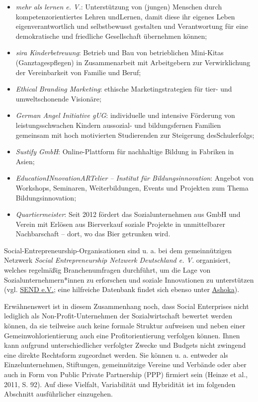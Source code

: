 \documentclass[
  letterpaper,
]{book}
\begin{document}
\begin{itemize}
\item
  \emph{mehr als lernen e. V.}: Unterstützung von (jungen) Menschen
  durch kompetenzorientiertes Lehren undLernen, damit diese ihr eigenes
  Leben eigenverantwortlich und selbstbewusst gestalten und
  Verantwortung für eine demokratische und friedliche Gesellschaft
  übernehmen können;
\item
  \emph{sira Kinderbetreuung}: Betrieb und Bau von betrieblichen
  Mini-Kitas (Ganztagespflegen) in Zusammenarbeit mit Arbeitgebern zur
  Verwirklichung der Vereinbarkeit von Familie und Beruf;
\item
  \emph{Ethical Branding Marketing}: ethische Marketingstrategien für
  tier- und umweltschonende Visionäre;
\item
  \emph{German Angel Initiative gUG}: individuelle und intensive
  Förderung von leistungsschwachen Kindern aussozial- und bildungsfernen
  Familien gemeinsam mit hoch motivierten Studierenden zur Steigerung
  desSchulerfolgs;
\item
  \emph{Sustify GmbH}: Online-Plattform für nachhaltige Bildung in
  Fabriken in Asien;
\item
  \emph{EducationINnovationARTelier -- Institut für Bildungsinnovation}:
  Angebot von Workshops, Seminaren, Weiterbildungen, Events und
  Projekten zum Thema Bildungsinnovation;
\item
  \emph{Quartiermeister}: Seit 2012 fördert das Sozialunternehmen aus
  GmbH und Verein mit Erlösen aus Bierverkauf soziale Projekte in
  unmittelbarer Nachbarschaft -- dort, wo das Bier getrunken wird.
\end{itemize}

Social-Entrepreneurship-Organisationen sind u. a. bei dem gemeinnützigen
Netzwerk \emph{Social Entrepreneurship Netzwerk Deutschland e. V.
}organisiert, welches regelmäßig Branchenumfragen durchführt, um die
Lage von Sozialunternehmern*innen zu erforschen und soziale Innovationen
zu unterstützen (vgl. \href{https://www.send-ev.de}{SEND e.V.}; eine
hilfreiche Datenbank findet sich ebenso unter
\href{https://www.ashoka.org}{Ashoka}).

Erwähnenswert ist in diesem Zusammenhang noch, dass Social Enterprises
nicht lediglich als Non-Profit-Unternehmen der Sozialwirtschaft bewertet
werden können, da sie teilweise auch keine formale Struktur aufweisen
und neben einer Gemeinwohlorientierung auch eine Profitorientierung
verfolgen können. Ihnen kann aufgrund unterschiedlicher verfolgter
Zwecke und Budgets nicht zwingend eine direkte Rechtsform zugeordnet
werden. Sie können u. a. entweder als Einzelunternehmen, Stiftungen,
gemeinnützige Vereine und Verbände oder aber auch in Form von Public
Private Partnership (PPP) firmiert sein (Heinze et al., 2011, S. 92).
Auf diese Vielfalt, Variabilität und Hybridität ist im folgenden
Abschnitt ausführlicher einzugehen.
\end{document}

